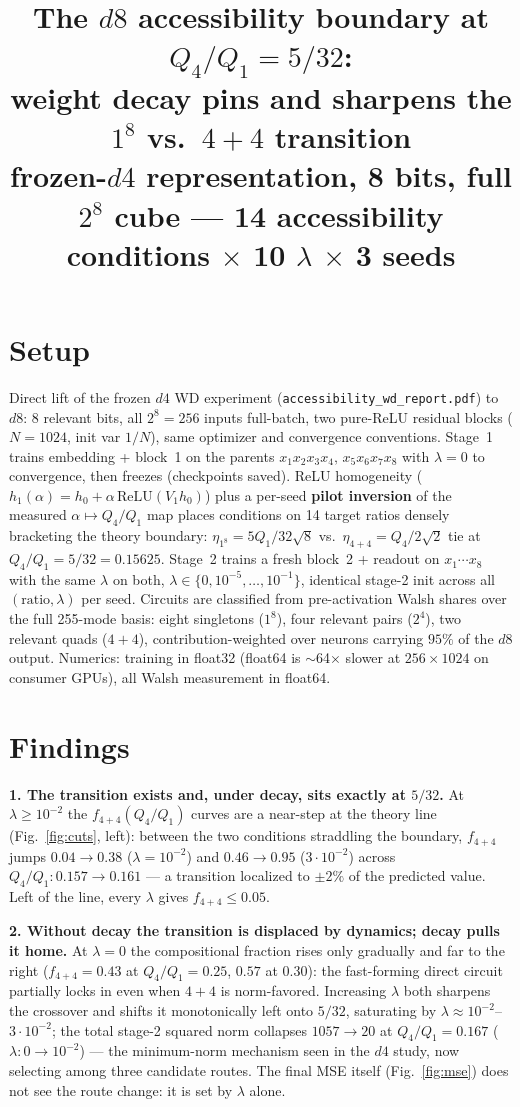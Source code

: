 \documentclass[10pt]{article}
\title{\vspace{-1.4cm}The $d8$ accessibility boundary at $Q_4/Q_1=5/32$:\\
weight decay pins and sharpens the $1^8$ vs.\ $4{+}4$ transition\\
\large frozen-$d4$ representation, 8 bits, full $2^8$ cube --- 14 accessibility conditions
$\times$ 10 $\lambda$ $\times$ 3 seeds}
\author{}\date{\vspace{-1.2cm}}
\begin{document}
\maketitle\vspace{-1.9cm}

\section*{Setup}
Direct lift of the frozen $d4$ WD experiment (\texttt{accessibility\_wd\_report.pdf}) to
$d8$: 8 relevant bits, all $2^8=256$ inputs full-batch, two pure-ReLU residual blocks
($N{=}1024$, init var $1/N$), same optimizer and convergence conventions. Stage~1 trains
embedding + block~1 on the parents $x_1x_2x_3x_4,\,x_5x_6x_7x_8$ with $\lambda=0$ to
convergence, then freezes (checkpoints saved). ReLU homogeneity
($h_1(\alpha)=h_0+\alpha\,\mathrm{ReLU}(V_1h_0)$) plus a per-seed \textbf{pilot inversion} of
the measured $\alpha\mapsto Q_4/Q_1$ map places conditions on 14 target ratios densely
bracketing the theory boundary: $\eta_{1^8}=5Q_1/32\sqrt8$ vs.\ $\eta_{4+4}=Q_4/2\sqrt2$ tie at
$Q_4/Q_1=5/32=0.15625$. Stage~2 trains a fresh block~2 + readout on $x_1\cdots x_8$ with the
same $\lambda$ on both, $\lambda\in\{0,10^{-5},\dots,10^{-1}\}$, identical stage-2 init across
all $(\text{ratio},\lambda)$ per seed. Circuits are classified from pre-activation Walsh shares
over the full 255-mode basis: eight singletons ($1^8$), four relevant pairs ($2^4$), two
relevant quads ($4{+}4$), contribution-weighted over neurons carrying $95\%$ of the $d8$
output. Numerics: training in float32 (float64 is $\sim$64$\times$ slower at $256{\times}1024$
on consumer GPUs), all Walsh measurement in float64.

\section*{Findings}
\textbf{1. The transition exists and, under decay, sits exactly at $5/32$.} At
$\lambda\geq10^{-2}$ the $f_{4+4}(Q_4/Q_1)$ curves are a near-step at the theory line
(Fig.~\ref{fig:cuts}, left): between the two conditions straddling the boundary,
$f_{4+4}$ jumps $0.04\to0.38$ ($\lambda=10^{-2}$) and $0.46\to0.95$ ($3{\cdot}10^{-2}$)
across $Q_4/Q_1: 0.157\to0.161$ --- a transition localized to $\pm2\%$ of the predicted value.
Left of the line, every $\lambda$ gives $f_{4+4}\leq0.05$.

\textbf{2. Without decay the transition is displaced by dynamics; decay pulls it home.} At
$\lambda=0$ the compositional fraction rises only gradually and far to the right
($f_{4+4}=0.43$ at $Q_4/Q_1=0.25$, $0.57$ at $0.30$): the fast-forming direct circuit
partially locks in even when $4{+}4$ is norm-favored. Increasing $\lambda$ both sharpens the
crossover and shifts it monotonically left onto $5/32$, saturating by
$\lambda\approx10^{-2}$--$3{\cdot}10^{-2}$; the total stage-2 squared norm collapses
$1057\to20$ at $Q_4/Q_1=0.167$ ($\lambda:0\to10^{-2}$) --- the minimum-norm mechanism seen in
the $d4$ study, now selecting among three candidate routes. The final MSE itself
(Fig.~\ref{fig:mse}) does not see the route change: it is set by $\lambda$ alone.
\end{document}
